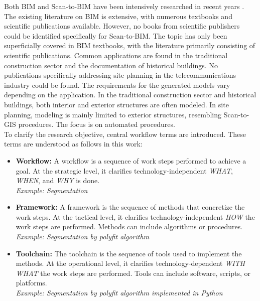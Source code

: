 \begin{English}
    Both BIM and Scan-to-BIM have been intensively researched in recent years \cite{rochaSurveyScantoBIMPractices2021}. \\
    The existing literature on BIM is extensive, with numerous textbooks and scientific publications available. However, no books from scientific publishers could be identified specifically for Scan-to-BIM. The topic has only been superficially covered in BIM textbooks, with the literature primarily consisting of scientific publications. Common applications are found in the traditional construction sector and the documentation of historical buildings. No publications specifically addressing site planning in the telecommunications industry could be found. The requirements for the generated models vary depending on the application. In the traditional construction sector and historical buildings, both interior and exterior structures are often modeled. In site planning, modeling is mainly limited to exterior structures, resembling Scan-to-GIS procedures. The focus is on automated procedures. \\

    To clarify the research objective, central workflow terms are introduced. These terms are understood as follows in this work:

    \begin{itemize}
        \item \textbf{Workflow:} A workflow is a sequence of work steps performed to achieve a goal. At the strategic level, it clarifies technology-independent \textit{WHAT}, \textit{WHEN}, and \textit{WHY} is done.\\
        \textit{Example: Segmentation}

        \item \textbf{Framework:} A framework is the sequence of methods that concretize the work steps. At the tactical level, it clarifies technology-independent \textit{HOW} the work steps are performed. Methods can include algorithms or procedures.\\
        \textit{Example: Segmentation by polyfit algorithm}

        \item \textbf{Toolchain:} The toolchain is the sequence of tools used to implement the methods. At the operational level, it clarifies technology-dependent \textit{WITH WHAT} the work steps are performed. Tools can include software, scripts, or platforms.\\
        \textit{Example: Segmentation by polyfit algorithm implemented in Python}
    \end{itemize}


\end{English}
